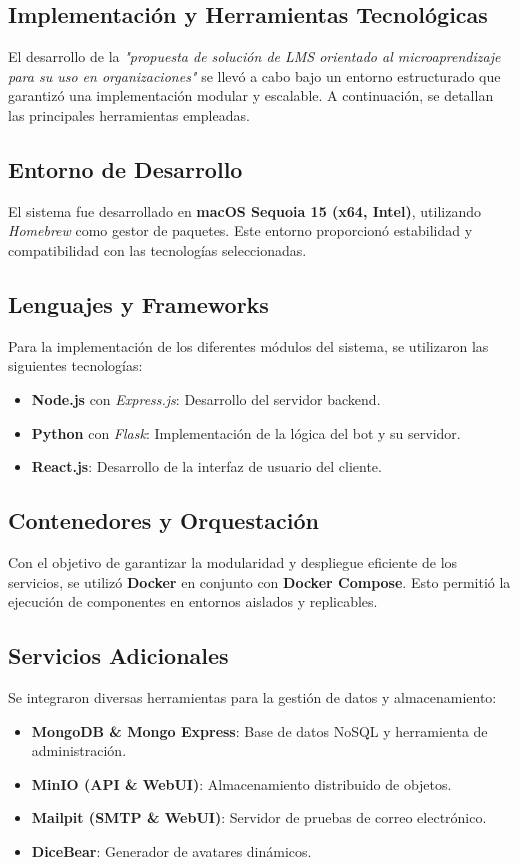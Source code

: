 \subsection{Implementación y Herramientas Tecnológicas}

El desarrollo de  la \textit{"propuesta de solución de LMS orientado al microaprendizaje para su uso en organizaciones"} se llevó a cabo bajo un entorno estructurado que garantizó una implementación modular y escalable. A continuación, se detallan las principales herramientas empleadas.

\subsection{Entorno de Desarrollo}
El sistema fue desarrollado en \textbf{macOS Sequoia 15 (x64, Intel)}, utilizando \textit{Homebrew} como gestor de paquetes. Este entorno proporcionó estabilidad y compatibilidad con las tecnologías seleccionadas.

\subsection{Lenguajes y Frameworks}
Para la implementación de los diferentes módulos del sistema, se utilizaron las siguientes tecnologías:
\begin{itemize}
	\item \textbf{Node.js} con \textit{Express.js}: Desarrollo del servidor backend.
	\item \textbf{Python} con \textit{Flask}: Implementación de la lógica del bot y su servidor.
	\item \textbf{React.js}: Desarrollo de la interfaz de usuario del cliente.
\end{itemize}

\subsection{Contenedores y Orquestación}
Con el objetivo de garantizar la modularidad y despliegue eficiente de los servicios, se utilizó \textbf{Docker} en conjunto con \textbf{Docker Compose}. Esto permitió la ejecución de componentes en entornos aislados y replicables.

\subsection{Servicios Adicionales}
Se integraron diversas herramientas para la gestión de datos y almacenamiento:
\begin{itemize}
	\item \textbf{MongoDB \& Mongo Express}: Base de datos NoSQL y herramienta de administración.
	\item \textbf{MinIO (API \& WebUI)}: Almacenamiento distribuido de objetos.
	\item \textbf{Mailpit (SMTP \& WebUI)}: Servidor de pruebas de correo electrónico.
	\item \textbf{DiceBear}: Generador de avatares dinámicos.
\end{itemize}

